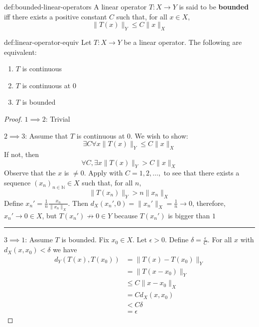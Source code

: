 \documentclass{article}
\begin{document}
\begin{dfn}{def:bounded-linear-operators}{}
    A linear operator $T : X \to Y$ is said to be \textbf{bounded} iff there exists a positive constant $C$ such that, for all $x\in X$,
    \[\lVert T(x) \rVert_{Y} \le C \lVert x \rVert_{X}\]
\end{dfn}

\begin{thm}{def:linear-operator-equiv}{}
    Let $T: X \to Y $ be a linear operator. The following are equivalent:
    \begin{enumerate}
        \item $T$ is continuous
        \item $T$ is continuous at $0$
        \item $T$ is bounded
    \end{enumerate}
\end{thm}

\begin{proof}
    $1 \implies 2$: Trivial

    $2 \implies 3$: Assume that $T$ is continuous at $0$. We wish to show:
    \[\exists C \forall x \lVert  T(x) \rVert_{Y} \le C \lVert x \rVert_{X}\]
    If not, then
    \[\forall C, \exists x \lVert  T(x) \rVert_{Y} > C \lVert x \rVert_{X}\]
    Observe that the $x$ is $\ne 0$. Apply with $C = 1,2,\dots,$ to see that there exists a sequence $(x_{n})_{n\in \mathbb{N}}\in X$ such that, for all $n$,
    \[\lVert T(x_{n}) \rVert_{Y} > n \lVert  x_{n} \rVert_{X}\]
    Define $x_{n}' = \frac{1}{n} \frac{x_{n}}{\lVert x_{n} \rVert_{X}}$. Then $d_{X}(x_{n}', 0) = \lVert x_{n}' \rVert_{X} = \frac{1}{n}\to 0$, therefore, $x_{n}' \to 0\in X$, but $T(x_{n}')\not\to 0 \in Y$ because $T(x_{n}')$ is bigger than $1$

    \noindent\rule{\textwidth}{0.2pt}
    $3 \implies 1$: Assume $T$ is bounded. Fix $x_{0}\in X$. Let $\epsilon > 0$. Define $\delta = \frac{\epsilon}{C}$. For all $x$ with $d_{X}(x,x_{0}) < \delta$ we have
    \begin{align*}
        d_{Y}(T(x), T(x_{0})) &= \lVert T(x) - T(x_{0}) \rVert_{Y}\\
                              &= \lVert T(x - x_{0}) \rVert_{Y}\\
                              &\le C \lVert x - x_{0} \rVert_{X}\\
                              &= C d_{X}(x,x_{0})\\
                              &< C\delta\\
                              &= \epsilon
    \end{align*}
\end{proof}
\end{document}

